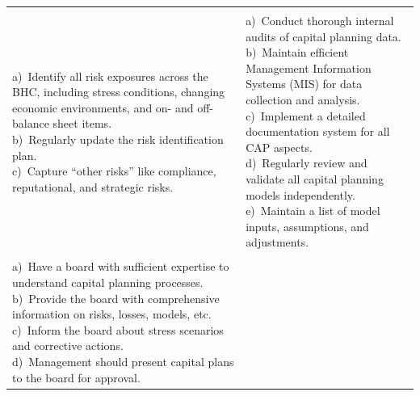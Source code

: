 

\noindent\begin{minipage}{\textwidth}
\renewcommand{\arraystretch}{1.3}
\begin{tabularx}{\textwidth}{@{}YY@{}}
  & \\
{\tabfont
a)~Identify all risk exposures across the BHC, including stress conditions,
changing economic environments, and on- and off-balance sheet items.\newline
b)~Regularly update the risk identification plan.\newline
c)~Capture ``other risks'' like compliance, reputational, and strategic risks.} &
{\tabfont
a)~Conduct thorough internal audits of capital planning data.\newline
b)~Maintain efficient Management Information Systems (MIS) for data collection and
analysis.\newline
c)~Implement a detailed documentation system for all CAP aspects.\newline
d)~Regularly review and validate all capital planning models independently.\newline
e)~Maintain a list of model inputs, assumptions, and adjustments.}\\
  & \\
{\tabfont
a)~Have a board with sufficient expertise to understand capital planning
processes.\newline
b)~Provide the board with comprehensive information on risks, losses, models,
etc.\newline
c)~Inform the board about stress scenarios and corrective actions.\newline
d)~Management should present capital plans to the board for approval.\newline
}
\end{tabularx}
\end{minipage}
